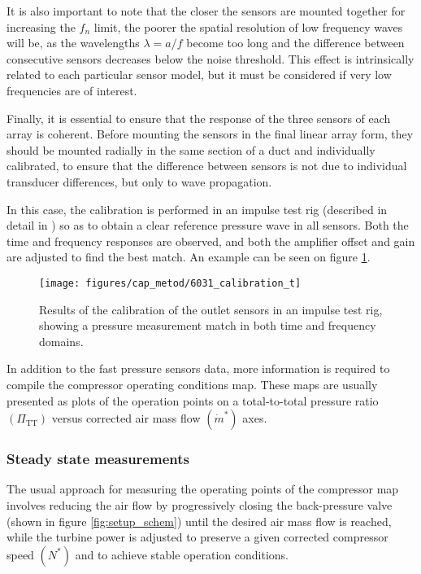 It is also important to note that the closer the sensors are mounted together for increasing the $f_n$ limit, the poorer the spatial resolution of low frequency waves will be, as the wavelengths $\lambda=a/f$ become too long and the difference between consecutive sensors decreases below the noise threshold. This effect is intrinsically related to each particular sensor model, but it must be considered if very low frequencies are of interest.

Finally, it is essential to ensure that the response of the three sensors of each array is coherent. Before mounting the sensors in the final linear array form, they should be mounted radially in the same section of a duct and individually calibrated, to ensure that the difference between sensors is not due to individual transducer differences, but only to wave propagation.

In this case, the calibration is performed in an impulse test rig (described in detail in \cite{payri2000modified}) so as to obtain a clear reference pressure wave in all sensors. Both the time and frequency responses are observed, and both the amplifier offset and gain are adjusted to find the best match. An example can be seen on figure \ref{fig:6031_calibration}.

\begin{figure}[t!]
\centering
\texttt{[image: figures/cap\_metod/6031\_calibration\_t]}
\caption{Results of the calibration of the outlet sensors in an impulse test rig, showing a pressure measurement match in both time and frequency domains.}
\label{fig:6031_calibration}
\end{figure}

In addition to the fast pressure sensors data, more information is required to compile the compressor operating conditions map. These maps are usually presented as plots of the operation points on a total-to-total pressure ratio $(\Pi_\text{TT})$ versus corrected air mass flow $(\dot m^*)$ axes.

\subsubsection{Steady state measurements}
\label{sub:steady_state_measurements}

The usual approach for measuring the operating points of the compressor map involves reducing the air flow by progressively closing the back-pressure valve (shown in figure \ref{fig:setup_schem}) until the desired air mass flow is reached, while the turbine power is adjusted to preserve a given corrected compressor speed $(N^*)$ and to achieve stable operation conditions.

